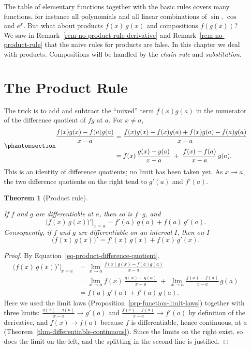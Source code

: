 \documentclass[
  letterpaper,
  DIV=11,
  numbers=noendperiod]{scrreprt}
\theoremstyle{plain}
\theoremstyle{plain}
\theoremstyle{definition}
\theoremstyle{definition}
\theoremstyle{definition}
\theoremstyle{plain}
\newtheorem{theorem}{Theorem}[chapter]
\theoremstyle{plain}
\theoremstyle{remark}
\begin{document}
The table of elementary functions together with the basic rules covers
many functions, for instance all polynomials and all linear combinations
of \(\sin\), \(\cos\) and \(e^x\). But what about products
\(f(x)\,g(x)\) and compositions \(f(g(x))\)? We saw in
Remark~\ref{rem-no-product-rule-derivative} and
Remark~\ref{rem-no-product-rule} that the naive rules for products are
false. In this chapter we deal with products. Compositions will be
handled by the \emph{chain rule} and \emph{substitution}.

\section{The Product Rule}\label{the-product-rule}

The trick is to add and subtract the ``mixed'' term \(f(x)g(a)\) in the
numerator of the difference quotient of \(fg\) at \(a\). For
\(x\neq a\),
\begin{equation}\protect\phantomsection\label{eq-product-difference-quotient}{
\begin{aligned}
\frac{f(x)g(x) - f(a)g(a)}{x-a}
&= \frac{f(x)g(x) - f(x)g(a) + f(x)g(a) - f(a)g(a)}{x-a} \\[4pt]
&= f(x)\,\frac{g(x)-g(a)}{x-a} \;+\; \frac{f(x)-f(a)}{x-a}\,g(a) .
\end{aligned}
}\end{equation} This is an identity of difference quotients; no limit
has been taken yet. As \(x\to a\), the two difference quotients on the
right tend to \(g'(a)\) and \(f'(a)\).

\begin{theorem}[Product
rule]\protect\hypertarget{thm-product-rule}{}\label{thm-product-rule}

If \(f\) and \(g\) are differentiable at \(a\), then so is \(f\cdot g\),
and \[
\big(f(x)\,g(x)\big)'\Big|_{x=a} = f'(a)\,g(a) + f(a)\,g'(a).
\] Consequently, if \(f\) and \(g\) are differentiable on an interval
\(I\), then on \(I\) \[
\big(f(x)\,g(x)\big)' = f'(x)\,g(x) + f(x)\,g'(x).
\]

\end{theorem}

\begin{proof}
By Equation~\ref{eq-product-difference-quotient}, \[
\begin{aligned}
\big(f(x)\,g(x)\big)'\Big|_{x=a}
&= \lim_{x\to a}\frac{f(x)g(x)-f(a)g(a)}{x-a} \\[4pt]
&= \lim_{x\to a} f(x)\,\frac{g(x)-g(a)}{x-a} \;+\; \lim_{x\to a}\frac{f(x)-f(a)}{x-a}\,g(a) \\[4pt]
&= f(a)\,g'(a) + f'(a)\,g(a).
\end{aligned}
\] Here we used the limit laws
(Proposition~\ref{prp-function-limit-laws}) together with three limits:
\(\frac{g(x)-g(a)}{x-a}\to g'(a)\) and
\(\frac{f(x)-f(a)}{x-a}\to f'(a)\) by definition of the derivative, and
\(f(x)\to f(a)\) because \(f\) is differentiable, hence continuous, at
\(a\) (Theorem~\ref{thm-differentiable-continuous}). Since the limits on
the right exist, so does the limit on the left, and the splitting in the
second line is justified.
\end{proof}
\end{document}
